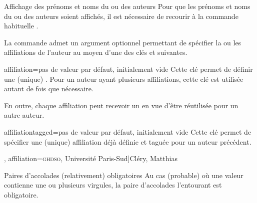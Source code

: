 \begin{dbremark}{Affichage des prénoms et noms du ou des auteurs}{}
  Pour que les prénoms et noms du ou des auteurs soient affichés, il est
  nécessaire de recourir à la commande habituelle .
\end{dbremark}

La commande  admet un argument optionnel permettant de spécifier
la ou les affiliations de l'auteur au moyen d'une des clés 
et  suivantes.

\begin{docKey}{affiliation}{={}}{pas de valeur par défaut,
    initialement vide}
  Cette clé permet de définir une (unique) . Pour un auteur
  ayant plusieurs affiliations, cette clé est utilisée autant de fois que
  nécessaire.

  En outre, chaque affiliation peut recevoir un  en vue d'être
  réutilisée pour un autre auteur.
\end{docKey}

\begin{docKey}{affiliationtagged}{={}}{pas de valeur par défaut,
    initialement vide}
  Cette clé permet de spécifier une (unique) affiliation déjà définie et taguée
  pour un auteur précédent.
\end{docKey}


\begin{bodycode}[listing options={deletekeywords={author}}]
\author[
  affiliation={Laboratoire \textsc{sphere}, Université Paris Diderot}
  ]{Bustamante, Martha-Cecilia}
\author[
  affiliation=[aff2]{\textsc{lpma}, Université Pierre et Marie Curie},
  affiliation={\textsc{ghdso}, Université Paris-Sud}]{Cléry, Matthias}
\author[
  affiliationtagged={aff2}
]{Mazliak, Laurent}
\end{bodycode}

\begin{dbwarning}{Paires d'accolades
    (relativement) obligatoires}{}
  Au cas (probable) où une valeur  contienne une ou plusieurs
  virgules, la paire d'accolades l'entourant est obligatoire.
\end{dbwarning}

